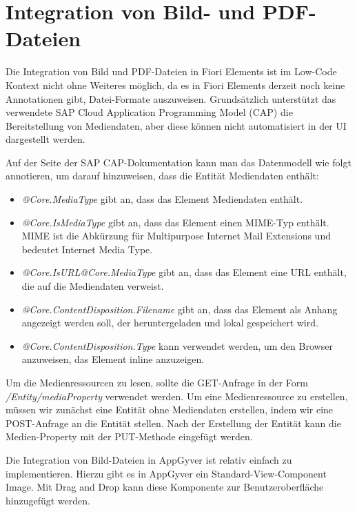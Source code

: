 \section{Integration von Bild- und PDF-Dateien}

Die Integration von Bild und PDF-Dateien in Fiori Elements ist im Low-Code Kontext nicht ohne Weiteres möglich, da es in Fiori Elements derzeit noch keine Annotationen gibt, Datei-Formate auszuweisen. Grundsätzlich unterstützt das verwendete SAP Cloud Application Programming Model (CAP) die Bereitstellung von Mediendaten\cite{sapc:smd}, aber diese können nicht automatisiert in der UI dargestellt werden.

Auf der Seite der SAP CAP-Dokumentation kann man das Datenmodell wie folgt annotieren, um darauf hinzuweisen, dass die Entität Mediendaten enthält:

\begin{itemize}[noitemsep]
\item \textit{@Core.MediaType} gibt an, dass das Element Mediendaten enthält. 
\item \textit{@Core.IsMediaType} gibt an, dass das Element einen MIME-Typ enthält. MIME ist die Abkürzung für Multipurpose Internet Mail Extensions und bedeutet Internet Media Type\cite{mi:pag}.
\item \textit{@Core.IsURL@Core.MediaType} gibt an, dass das Element eine URL enthält, die auf die Mediendaten verweist.
\item \textit{@Core.ContentDisposition.Filename} gibt an, dass das Element als Anhang angezeigt werden soll, der heruntergeladen und lokal gespeichert wird.
\item \textit{@Core.ContentDisposition.Type} kann verwendet werden, um den Browser anzuweisen, das Element inline anzuzeigen.
\end{itemize}

Um die Medienressourcen zu lesen, sollte die GET-Anfrage in der Form \textit{/Entity/mediaProperty} verwendet werden. Um eine Medienressource zu erstellen, müssen wir zunächst eine Entität ohne Mediendaten erstellen, indem wir eine POST-Anfrage an die Entität stellen. Nach der Erstellung der Entität kann die Medien-Property mit der PUT-Methode eingefügt werden\cite{sapc:smd}. 

Die Integration von Bild-Dateien in AppGyver ist relativ einfach zu implementieren. Hierzu gibt es in AppGyver ein Standard-View-Component Image. Mit Drag and Drop kann diese Komponente zur Benutzeroberfläche hinzugefügt werden. 

